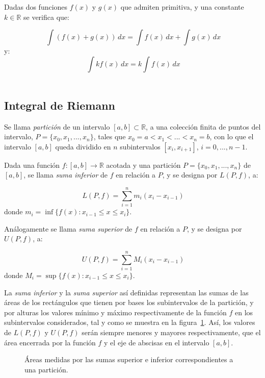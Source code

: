 Dadas dos funciones $f(x)$ y $g(x)$ que admiten primitiva, y una
constante $k \in \mathbb{R}$ se verifica que:

\[
\ \int{(f(x)+g(x))}\,dx=\int{f(x)}\,dx+\int{g(x)}\,dx
\]
y:
\[
\ \int{kf(x)}\,dx=k\int{f(x)}\,dx
\]\\


\subsection{Integral de Riemann}

Se llama \emph{partición} de un intervalo $[a,b]\subset\mathbb{R}$,
a una colección finita de puntos del intervalo,
$P=\{x_{0},x_{1},...,x_{n}\}$,  tales que
$x_{0}=a<x_{1}<...<x_{n}=b$, con lo que el intervalo $[a,b]$ queda
dividido en $n$ subintervalos $[x_{i},x_{i+1}]$, $i=0,...,n-1$.

Dada una función $f:[a,b]\rightarrow\mathbb{R}$ acotada y una
partición $P=\{x_{0},x_{1},...,x_{n}\}$ de $[a,b]$, se llama
\emph{suma inferior} de $f$ en relación a $P$, y se designa por
$L(P,f)$, a:

\[
\ L(P,f)=\sum_{i=1}^{n} m_{i}(x_{i}-x_{i-1})
\]
donde $  m_{i}=\inf\{f(x):x_{i-1}\leq x \leq x_{i}\}$.

Análogamente se llama \emph{suma superior} de $f$ en relación a $P$,
y se designa por $U(P,f)$, a:

\[
\ U(P,f)=\sum_{i=1}^{n} M_{i}(x_{i}-x_{i-1})
\]
donde $ M_{i}=\sup\{f(x):x_{i-1}\leq x \leq x_{i}\}$.

La \emph{suma inferior} y la \emph{suma superior} así definidas
representan las sumas de las áreas de los rectángulos que tienen por
bases los subintervalos de la partición, y por alturas los valores
mínimo y máximo respectivamente de la función $f$ en los
subintervalos considerados, tal y como se muestra en la
figura~\ref{g:sumassupinf}. Así, los valores de $L(P,f)$ y $U(P,f)$
serán siempre menores y mayores respectivamente, que el área
encerrada por la función $f$ y el eje de abscisas en el intervalo
$[a,b]$.

\begin{figure}[htbp]
\centering {}\qquad\qquad
{}
\caption{Áreas medidas por las sumas superior e inferior
correspondientes a una partición.} \label{g:sumassupinf}
\end{figure}

